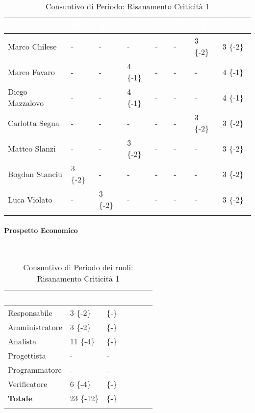 \begin{longtable}{|C{.30\textwidth}|C{.06\textwidth}|C{.06\textwidth}|C{.06\textwidth} | C{.06\textwidth}| C{.06\textwidth} | C{.06\textwidth} | C{.10\textwidth} |}
\hline
{}	\textbf{\textcolor{white}{Nome}} & \textbf{\textcolor{white}{RE}} & \textbf{\textcolor{white}{AM}} & \textbf{\textcolor{white}{AN}} & \textbf{\textcolor{white}{PJ}} & \textbf{\textcolor{white}{PR}} & \textbf{\textcolor{white}{VE}} & \textbf{\textcolor{white}{Totale}}\\
\hline \hline

Marco Chilese & - & - & - & - & - & 3 \{-2\} & 3 \{-2\}\\
\hline
{}Marco Favaro & - & - & 4 \{-1\} & - & - & - & 4 \{-1\} \\
\hline
Diego Mazzalovo & - & - & 4 \{-1\} & - & - & - & 4 \{-1\} \\
\hline
{}Carlotta Segna & - & - & - & - & - & 3 \{-2\} & 3 \{-2\}\\
\hline
Matteo Slanzi & - & - & 3 \{-2\} & - & - & - & 3 \{-2\}\\
\hline
{}Bogdan Stanciu & 3 \{-2\} & - & - & - & - & - & 3 \{-2\} \\
\hline
Luca Violato & - & 3 \{-2\}& - & - & - & - & 3 \{-2\} \\
\hline

\caption{Consuntivo di Periodo: Risanamento Criticità 1}
\label{Distribuzione oraria del periodo di rc1}
\end{longtable}

\paragraph{Prospetto Economico} \-\\

\begin{longtable}{| C{.30\textwidth}| C{.15\textwidth}| C{.20\textwidth}|}
\hline
{}\textbf{\textcolor{white}{Ruolo}} & \textbf{\textcolor{white}{Ore}} & \textbf{\textcolor{white}{Costo in \euro}} \\
\hline 
Responsabile & 3 \{-2\} &  \{-\}\\
\hline
{}Amministratore & 3 \{-2\} &  \{-\} \\
\hline
Analista & 11 \{-4\} &  \{-\} \\
\hline
{}Progettista & - & - \\
\hline
Programmatore & - & - \\
\hline
{}Verificatore & 6 \{-4\} &  \{-\}\\
\hline
\textbf{Totale} & 23 \{-12\} &  \{-\} \\
\hline
\caption{Consuntivo di Periodo dei ruoli: Risanamento Criticità 1}
\label{Distribuzione oraria Ruoli del Periodo di rc1}
\end{longtable}

